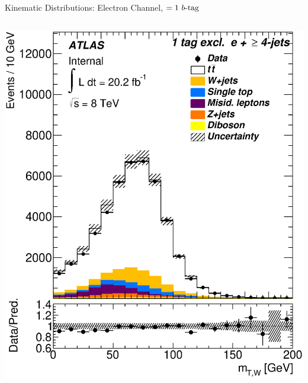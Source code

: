 \documentclass{beamer}
\begin{document}
{\begin{frame}{Kinematic Distributions: Electron Channel, $=1\text{ } \lowercase{ b\text{-tag}}$}
\begin{columns}
      \includegraphics[width=.95\textwidth]{../chapters/whel/figures/control_Plots2/bTag_1excl/TransverseMass_el}
    \end{columns}
  \end{frame}

}
\end{document}
